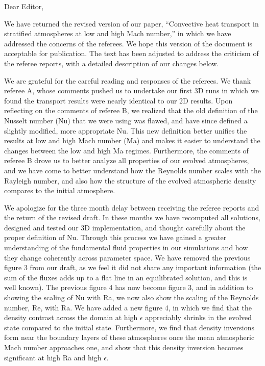 \documentclass[aps, 11pt, singlecolumn]{revtex4-1} %
\begin{document}
\noindent
Dear Editor,
$\,$\newline

\newenvironment{myquotation}{
\begin{quotation}
\itshape
}{ 
\end{quotation}
}

\begin{singlespace}
We have returned the revised version of our paper, 
``Convective heat transport in stratified atmospheres at low and high
Mach number,'' in which we have addressed the concerns of the referees.
We hope this version of the document is acceptable for publication.  The text 
has been adjusted to address the criticism of the referee reports,
with a detailed description of our changes below.

We are grateful for the careful reading and responses of the referees.  
We thank referee A, whose
comments pushed us to undertake our first 3D runs in which we found the
transport results were nearly identical to our 2D results.
Upon reflecting on the
comments of referee B, we realized that the old definition of the
Nusselt number (Nu) that we were using was flawed, and have since defined
a slightly modified, more appropriate Nu.  This new definition better unifies
the results at low and high Mach number (Ma) and makes it easier to understand
the changes between the low and high Ma regimes.  Furthermore, 
the comments of referee B drove us to better analyze all properties of our evolved
atmospheres, and we have come to better understand how the Reynolds number scales with
the Rayleigh number, and also how the structure of the evolved atmospheric density
compares to the initial atmosphere.

We apologize for the three month delay between receiving the referee reports
and the return of the revised draft.  In these months we have
recomputed all solutions, designed and tested our 3D implementation, and
thought carefully about the proper definition of Nu.  Through this
process we have gained a greater understanding of the fundamental
fluid properties in our simulations and how they change coherently
across parameter space.  We have removed the previous figure 3 from our
draft, as we feel it did not share any important information (the sum of
the fluxes adds up to a flat line in an equilibrated solution, and this
is well known).  The previous figure 4 has now become figure 3, and in addition
to showing the scaling of Nu with Ra, we now also show the scaling of the
Reynolds number, Re, with Ra.  We have added a new figure 4, in which we
find that the density contrast across the domain at high $\epsilon$ appreciably
shrinks in the evolved state compared to the initial state.  Furthermore, we
find that density inversions form near the boundary layers of these atmospheres
once the mean atmospheric Mach number approaches one, and show that this density
inversion becomes significant at high Ra and high $\epsilon$.


\end{singlespace}
\end{document}
